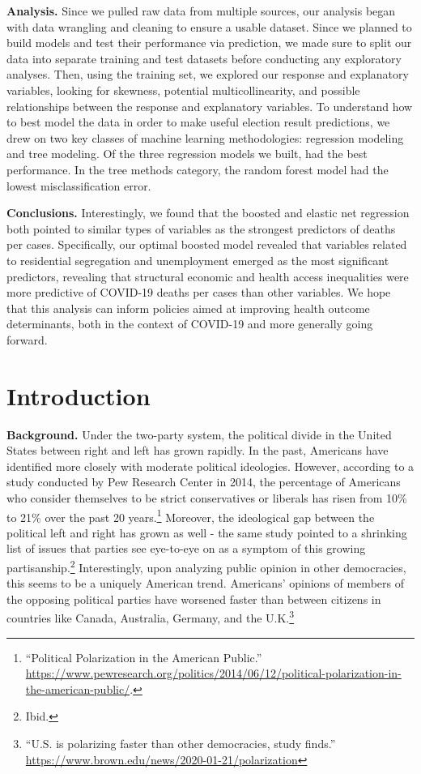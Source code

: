 \documentclass[
]{article}
\begin{document}
\textbf{Analysis.} Since we pulled raw data from multiple sources, our analysis began with data wrangling and cleaning to ensure a usable dataset. Since we planned to build models and test their performance via prediction, we made sure to split our data into separate training and test datasets before conducting any exploratory analyses. Then, using the training set, we explored our response and explanatory variables, looking for skewness, potential multicollinearity, and possible relationships between the response and explanatory variables. To understand how to best model the data in order to make useful election result predictions, we drew on two key classes of machine learning methodologies: regression modeling and tree modeling. Of the three regression models we built, had the best performance. In the tree methods category, the random forest model had the lowest misclassification error.

\textbf{Conclusions.} Interestingly, we found that the boosted and elastic net regression both pointed to similar types of variables as the strongest predictors of deaths per cases. Specifically, our optimal boosted model revealed that variables related to residential segregation and unemployment emerged as the most significant predictors, revealing that structural economic and health access inequalities were more predictive of COVID-19 deaths per cases than other variables. We hope that this analysis can inform policies aimed at improving health outcome determinants, both in the context of COVID-19 and more generally going forward.

\hypertarget{introduction}{%
\section{Introduction}\label{introduction}}

\textbf{Background.} Under the two-party system, the political divide in the United States between right and left has grown rapidly. In the past, Americans have identified more closely with moderate political ideologies. However, according to a study conducted by Pew Research Center in 2014, the percentage of Americans who consider themselves to be strict conservatives or liberals has risen from 10\% to 21\% over the past 20 years.\footnote{``Political Polarization in the American Public.'' \url{https://www.pewresearch.org/politics/2014/06/12/political-polarization-in-the-american-public/}.} Moreover, the ideological gap between the political left and right has grown as well - the same study pointed to a shrinking list of issues that parties see eye-to-eye on as a symptom of this growing partisanship.\footnote{Ibid.} Interestingly, upon analyzing public opinion in other democracies, this seems to be a uniquely American trend. Americans' opinions of members of the opposing political parties have worsened faster than between citizens in countries like Canada, Australia, Germany, and the U.K.\footnote{``U.S. is polarizing faster than other democracies, study finds.'' \url{https://www.brown.edu/news/2020-01-21/polarization}}
\end{document}

